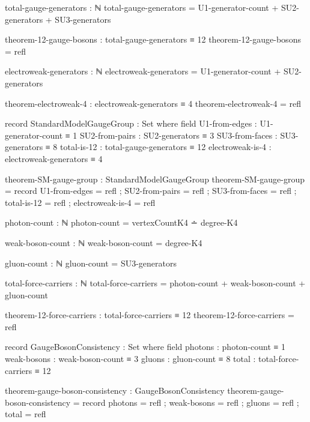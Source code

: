\documentclass[11pt,a4paper]{book}
\begin{document}
\begin{code}
total-gauge-generators : ℕ
total-gauge-generators = U1-generator-count + SU2-generators + SU3-generators

theorem-12-gauge-bosons : total-gauge-generators ≡ 12
theorem-12-gauge-bosons = refl

electroweak-generators : ℕ
electroweak-generators = U1-generator-count + SU2-generators

theorem-electroweak-4 : electroweak-generators ≡ 4
theorem-electroweak-4 = refl

record StandardModelGaugeGroup : Set where
  field
    U1-from-edges    : U1-generator-count ≡ 1
    SU2-from-pairs   : SU2-generators ≡ 3
    SU3-from-faces   : SU3-generators ≡ 8
    total-is-12      : total-gauge-generators ≡ 12
    electroweak-is-4 : electroweak-generators ≡ 4

theorem-SM-gauge-group : StandardModelGaugeGroup
theorem-SM-gauge-group = record
  { U1-from-edges    = refl
  ; SU2-from-pairs   = refl
  ; SU3-from-faces   = refl
  ; total-is-12      = refl
  ; electroweak-is-4 = refl
  }
\end{code}

\begin{code}
photon-count : ℕ
photon-count = vertexCountK4 ∸ degree-K4

weak-boson-count : ℕ
weak-boson-count = degree-K4

gluon-count : ℕ
gluon-count = SU3-generators

total-force-carriers : ℕ
total-force-carriers = photon-count + weak-boson-count + gluon-count

theorem-12-force-carriers : total-force-carriers ≡ 12
theorem-12-force-carriers = refl

record GaugeBosonConsistency : Set where
  field
    photons     : photon-count ≡ 1
    weak-bosons : weak-boson-count ≡ 3
    gluons      : gluon-count ≡ 8
    total       : total-force-carriers ≡ 12

theorem-gauge-boson-consistency : GaugeBosonConsistency
theorem-gauge-boson-consistency = record
  { photons     = refl
  ; weak-bosons = refl
  ; gluons      = refl
  ; total       = refl
  }
\end{code}
\end{document}
